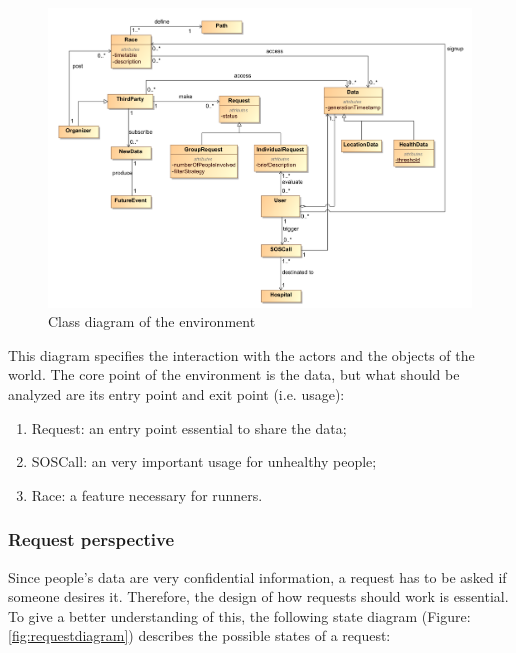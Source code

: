 \begin{figure}[H]
\includegraphics[width=\linewidth]{Images/classdiagram}
\caption{Class diagram of the environment}
\label{fig:classdiagram}
\end{figure}

This diagram specifies the interaction with the actors and the objects of the world. The core point of 
the environment is the data, but what should be analyzed are its entry point and exit point (i.e. usage):

\begin{enumerate}
\item Request: an entry point essential to share the data;
\item SOSCall: an very important usage for unhealthy people;
\item Race: a feature necessary for runners.
\end{enumerate}

\subsubsection{Request perspective}
Since people's data are very confidential information, a request has to be asked if someone desires it. 
Therefore, the design of how requests should work is essential. To give a better understanding of this, 
the following state diagram (Figure: \ref{fig:requestdiagram})  describes the possible states of a request:

